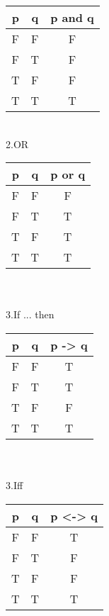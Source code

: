 \begin{left}
    \begin{tabular}{c |c| c}
       p  & q & p and q  \\
        \hline
       F  & F & F \\
        F  & T & F \\
         T  & F & F \\
          T  & T & T \\
    \end{tabular}
\end{left}
\\

2.OR
\\

\begin{left}
    \begin{tabular}{c |c| c}
       p  & q & p or q  \\
        \hline
       F  & F & F \\
        F  & T & T \\
         T  & F & T \\
          T  & T & T \\
    \end{tabular}
\end{left}
\\
\\

3.If ... then
\\

\begin{left}
    \begin{tabular}{c |c| c}
   
       p  & q & p -> q  \\
        \hline
       F  & F & T \\
        F  & T & T \\
         T  & F & F \\
          T  & T & T \\
    \end{tabular}
\end{left}
\\
\\

3.Iff
\\

\begin{left}
    \begin{tabular}{c |c| c}
       p  & q & p <-> q  \\
        \hline
       F  & F & T \\
        F  & T & F \\
         T  & F & F \\
          T  & T & T \\
    \end{tabular}
\end{left}